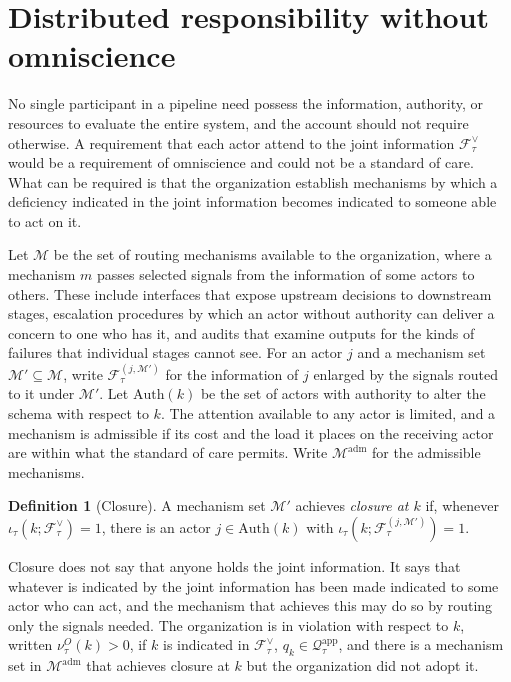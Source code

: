 \documentclass[11pt]{article}
\newcommand{\F}{\mathcal F}
\newcommand{\Q}{\mathcal Q}
\newcommand{\M}{\mathcal M}
\newcommand{\adm}{\mathrm{adm}}
\newcommand{\app}{\mathrm{app}}
\theoremstyle{plain}
\theoremstyle{definition}
\newtheorem{definition}{Definition}
\begin{document}
\section{Distributed responsibility without omniscience}

No single participant in a pipeline need possess the information, authority, or resources to evaluate the entire system, and the account should not require otherwise. A requirement that each actor attend to the joint information $\F^{\vee}_\tau$ would be a requirement of omniscience and could not be a standard of care. What can be required is that the organization establish mechanisms by which a deficiency indicated in the joint information becomes indicated to someone able to act on it.

Let $\M$ be the set of routing mechanisms available to the organization, where a mechanism $m$ passes selected signals from the information of some actors to others. These include interfaces that expose upstream decisions to downstream stages, escalation procedures by which an actor without authority can deliver a concern to one who has it, and audits that examine outputs for the kinds of failures that individual stages cannot see. For an actor $j$ and a mechanism set $\M'\subseteq\M$, write $\F^{(j,\M')}_\tau$ for the information of $j$ enlarged by the signals routed to it under $\M'$. Let $\mathrm{Auth}(k)$ be the set of actors with authority to alter the schema with respect to $k$. The attention available to any actor is limited, and a mechanism is admissible if its cost and the load it places on the receiving actor are within what the standard of care permits. Write $\M^{\adm}$ for the admissible mechanisms.

\begin{definition}[Closure]
A mechanism set $\M'$ achieves \emph{closure at $k$} if, whenever $\iota_\tau(k;\F^{\vee}_\tau)=1$, there is an actor $j\in\mathrm{Auth}(k)$ with $\iota_\tau(k;\F^{(j,\M')}_\tau)=1$.
\end{definition}

Closure does not say that anyone holds the joint information. It says that whatever is indicated by the joint information has been made indicated to some actor who can act, and the mechanism that achieves this may do so by routing only the signals needed. The organization is in violation with respect to $k$, written $\nu^{O}_\tau(k)>0$, if $k$ is indicated in $\F^{\vee}_\tau$, $q_k\in\Q_\tau^{\app}$, and there is a mechanism set in $\M^{\adm}$ that achieves closure at $k$ but the organization did not adopt it.
\end{document}

